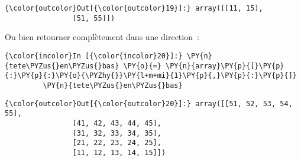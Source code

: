 \begin{Verbatim}[commandchars=\\\{\}]
{\color{outcolor}Out[{\color{outcolor}19}]:} array([[11, 15],
                [51, 55]])
\end{Verbatim}
            
    Ou bien retourner complètement dans une direction~:

    \begin{Verbatim}[commandchars=\\\{\}]
{\color{incolor}In [{\color{incolor}20}]:} \PY{n}{tete\PYZus{}en\PYZus{}bas} \PY{o}{=} \PY{n}{array}\PY{p}{[}\PY{p}{:}\PY{p}{:}\PY{o}{\PYZhy{}}\PY{l+m+mi}{1}\PY{p}{,}\PY{p}{:}\PY{p}{]}
         \PY{n}{tete\PYZus{}en\PYZus{}bas}
\end{Verbatim}


\begin{Verbatim}[commandchars=\\\{\}]
{\color{outcolor}Out[{\color{outcolor}20}]:} array([[51, 52, 53, 54, 55],
                [41, 42, 43, 44, 45],
                [31, 32, 33, 34, 35],
                [21, 22, 23, 24, 25],
                [11, 12, 13, 14, 15]])
\end{Verbatim}
            

    
    
    
